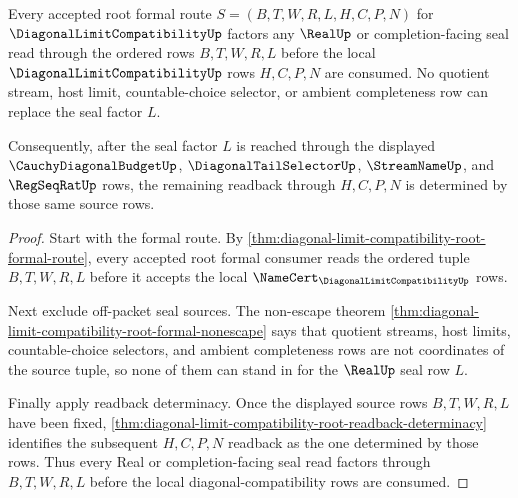 \begin{theorem}
\label{thm:diagonal-limit-compatibility-root-formal-seal-factorization}
Every accepted root formal route $S=(B,T,W,R,L,H,C,P,N)$ for $\DiagonalLimitCompatibilityUp$ factors any $\RealUp$ or completion-facing seal read through the ordered rows $B,T,W,R,L$ before the local $\DiagonalLimitCompatibilityUp$ rows $H,C,P,N$ are consumed. No quotient stream, host limit, countable-choice selector, or ambient completeness row can replace the seal factor $L$.

Consequently, after the seal factor $L$ is reached through the displayed $\CauchyDiagonalBudgetUp$, $\DiagonalTailSelectorUp$, $\StreamNameUp$, and $\RegSeqRatUp$ rows, the remaining readback through $H,C,P,N$ is determined by those same source rows.
\end{theorem}
\begin{proof}
Start with the formal route. By \autoref{thm:diagonal-limit-compatibility-root-formal-route}, every accepted root formal consumer reads the ordered tuple $B,T,W,R,L$ before it accepts the local $\NameCert_{\DiagonalLimitCompatibilityUp}$ rows.

Next exclude off-packet seal sources. The non-escape theorem \autoref{thm:diagonal-limit-compatibility-root-formal-nonescape} says that quotient streams, host limits, countable-choice selectors, and ambient completeness rows are not coordinates of the source tuple, so none of them can stand in for the $\RealUp$ seal row $L$.

Finally apply readback determinacy. Once the displayed source rows $B,T,W,R,L$ have been fixed, \autoref{thm:diagonal-limit-compatibility-root-readback-determinacy} identifies the subsequent $H,C,P,N$ readback as the one determined by those rows. Thus every Real or completion-facing seal read factors through $B,T,W,R,L$ before the local diagonal-compatibility rows are consumed.
\end{proof}

